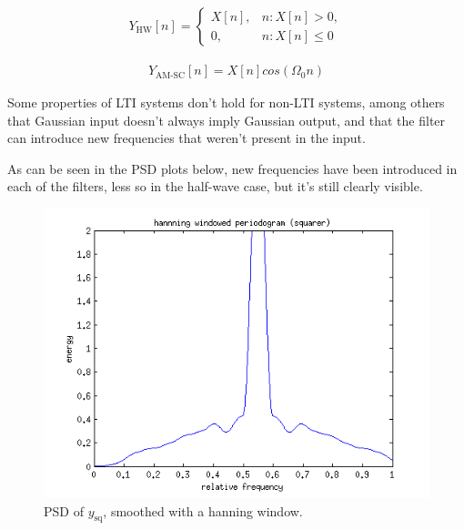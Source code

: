 \documentclass[10pt]{article}
\begin{document}
\begin{align*}
  Y_\text{HW}[n] =
\begin{cases}
   X[n],& n: X[n]>0,\\
    0,    & n: X[n] \leq 0
\end{cases}
\end{align*}

\begin{align*}
  Y_\text{AM-SC}[n] =X[n]cos(\Omega_{0}n)
\end{align*}

Some properties of LTI systems don't hold for non-LTI systems, among others that Gaussian input doesn't always imply Gaussian output, and that the filter can introduce new frequencies that weren't present in the input.

As can be seen in the PSD plots below, new frequencies have been introduced in each of the filters, less so in the half-wave case, but it's still clearly visible.


\begin{figure}[!hp]
    \begin{center}
      \includegraphics[width=1\textwidth]{ideal_periodogram_hanning_squarer}
    \caption{PSD of $y_\text{sq}$, smoothed with a hanning window. \label{fig:TheoACFsimple}}
    \end{center}
\end{figure}
\end{document}
